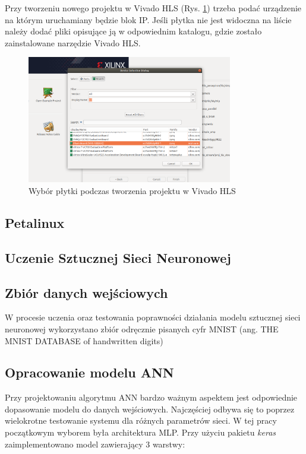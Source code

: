 Przy tworzeniu nowego projektu w Vivado HLS (Rys. \ref{hls_new_project}) trzeba podać 
urządzenie na którym uruchamiany będzie blok IP. Jeśli płytka nie jest widoczna na 
liście należy dodać pliki opisujące ją w odpowiednim katalogu, gdzie zostało 
zainstalowane narzędzie Vivado HLS.  

\begin{figure}
  \centering
  \includegraphics[width=0.8\textwidth]{img/vivado-hls-new.png}
  \caption{Wybór płytki podczas tworzenia projektu w Vivado HLS}
  \label{hls_new_project}
\end{figure}


\subsection{Petalinux}

\subsection{Uczenie Sztucznej Sieci Neuronowej}

\subsection{Zbiór danych wejściowych}

W procesie uczenia oraz testowania poprawności działania modelu sztucznej 
sieci neuronowej wykorzystano zbiór odręcznie pisanych cyfr MNIST 
(ang. THE MNIST DATABASE of handwritten digits)
\cite{lecun-mnisthandwrittendigit-2010}


\subsection{Opracowanie modelu ANN}

Przy projektowaniu algorytmu ANN bardzo ważnym aspektem jest odpowiednie dopasowanie 
modelu do danych wejściowych. Najczęściej odbywa się to poprzez wielokrotne testowanie
systemu dla różnych parametrów sieci. W tej pracy początkowym wyborem była architektura
MLP. Przy użyciu pakietu \emph{keras} zaimplementowano model zawierający 3 warstwy:

